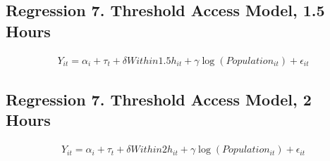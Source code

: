 \documentclass[a4paper, 10pt]{article}
\begin{document}
\begin{table}[H]
\centering
\caption{Regression 6. Saving Toward Two-Hour Threshold Model: 의사}

\end{table}

\subsection{Regression 7. Threshold Access Model, 1.5 Hours}
\begin{align*}
    Y_{it}=\alpha_i+\tau_t+\delta Within1.5h_{it}+\gamma\log(Population_{it})+\epsilon_{it}
\end{align*}
\begin{table}[H]
\centering
\caption{Regression 7. Threshold Access Model, 1.5 Hours: 의원}

\end{table}

\begin{table}[H]
\centering
\caption{Regression 7. Threshold Access Model, 1.5 Hours: 병원}

\end{table}

\begin{table}[H]
\centering
\caption{Regression 7. Threshold Access Model, 1.5 Hours: 종합병원}

\end{table}

\begin{table}[H]
\centering
\caption{Regression 7. Threshold Access Model, 1.5 Hours: 상급종합병원}

\end{table}

\begin{table}[H]
\centering
\caption{Regression 7. Threshold Access Model, 1.5 Hours: 의사}

\end{table}

\subsection{Regression 7. Threshold Access Model, 2 Hours}
\begin{align*}
    Y_{it}=\alpha_i+\tau_t+\delta Within2h_{it}+\gamma\log(Population_{it})+\epsilon_{it}
\end{align*}
\begin{table}[H]
\centering
\caption{Regression 7. Threshold Access Model, 2 Hours: 의원}

\end{table}
\end{document}
